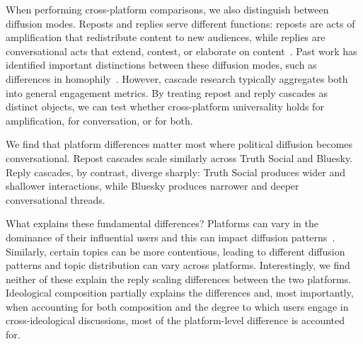 \documentclass[letterpaper]{article} %
\newcommand{\rev}[1]{{\color{blue}#1}}
\begin{document}
When performing cross-platform comparisons, we also distinguish between diffusion modes. Reposts and replies serve different functions: reposts are acts of amplification that redistribute content to new audiences, while replies are conversational acts that extend, contest, or elaborate on content~\citep{conover_political_2011,boyd_tweet_2010,guerrero_sole_interactive_2018}. Past work has identified important distinctions between these diffusion modes, such as differences in homophily~\citep{conover_political_2011}. However, cascade research typically aggregates both into general engagement metrics. By treating repost and reply cascades as distinct objects, we can test whether cross-platform universality holds for amplification, for conversation, or for both.



We find that platform differences matter most where political diffusion becomes conversational. Repost cascades scale similarly across Truth Social and Bluesky. %
Reply cascades, by contrast, diverge sharply: Truth Social produces wider and shallower interactions, while Bluesky produces narrower and deeper conversational threads. 

What explains these fundamental differences? Platforms can vary in the dominance of their influential users and this can impact diffusion patterns~\citep{goel_structural_2016, zannettou_what_2018}. 
Similarly, certain topics can be more contentious, leading to different diffusion patterns \cite{vosoughi_spread_2018} and topic distribution can vary across platforms. Interestingly, we find neither of these explain the reply scaling differences between the two platforms. Ideological composition partially explains the differences and, most importantly, when accounting for both composition and the degree to which users engage in cross-ideological discussions, \rev{most of the platform-level difference is accounted for.} 
\end{document}
